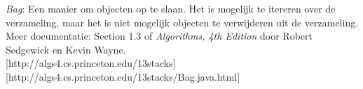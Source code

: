 \documentclass[tt3]{penoverslag}
\begin{document}
\begin{thebibliography}{9}
\textit{Bag}: Een manier om objecten op te slaan. Het is mogelijk te itereren over de verzameling, maar het is niet mogelijk objecten te verwijderen uit de verzameling. Meer documentatie: Section 1.3 of \textit{Algorithms, 4th Edition} door Robert Sedgewick en Kevin Wayne.\\
\mbox{[http://algs4.cs.princeton.edu/13stacks]} \mbox{[http://algs4.cs.princeton.edu/13stacks/Bag.java.html]}
\end{thebibliography}
\end{document}
